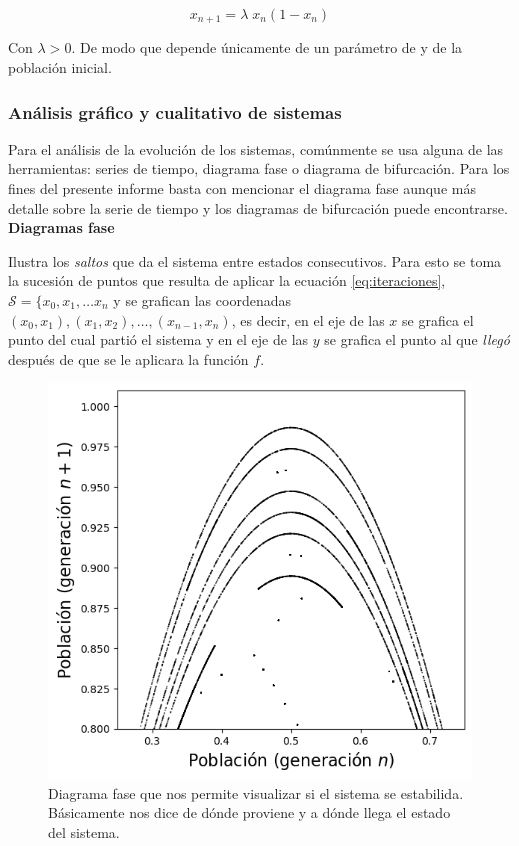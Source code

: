 \documentclass[letterpaper,12pt,oneside]{book}
\begin{document}
\begin{equation}
x_{n+1} = \lambda \;  x_{n} \left (1 - x_{n}\right )
\label{eq:logísitca}
\end{equation}

Con $\lambda > 0$. De modo que depende únicamente de un parámetro de y de la población inicial.


\subsubsection{Análisis gráfico y cualitativo de sistemas}

Para el análisis de la evolución de los sistemas, comúnmente se usa alguna de las herramientas: series de tiempo, diagrama fase o diagrama de bifurcación. Para los fines del presente informe basta con mencionar el diagrama fase aunque más detalle sobre la serie de tiempo y los diagramas de bifurcación puede encontrarse.
\\

\textbf{Diagramas fase}

Ilustra los \textit{saltos} que da el sistema entre estados consecutivos. Para esto se toma la sucesión de puntos que resulta de aplicar la ecuación \ref{eq:iteraciones}, $\mathcal{S} = \{ x_{0}, x_{1}, \ldots x_{n}$ y se grafican las coordenadas ${(x_{0}, x_{1}), (x_{1}, x_{2}), \ldots, (x_{n-1}, x_{n})}$, es decir, en el eje de las $x$ se grafica el punto del cual partió el sistema y en el eje de las $y$ se grafica el punto al que \textit{llegó} después de que se le aplicara la función $f$.
\\

\begin{figure}[h!]
    \centering
    \includegraphics[width=0.5\columnwidth]{Ilustraciones/Cap_SFI/Diagramas fase.png}
    \caption{Diagrama fase que nos permite visualizar si el sistema se estabilida. Básicamente nos dice de dónde proviene y a dónde llega el estado del sistema.}
    \label{fig:diagrama_fase_logística}
\end{figure}
\end{document}
